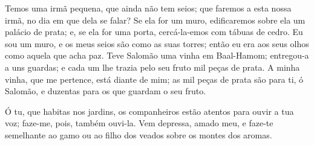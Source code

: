 Temos uma irmã pequena, que ainda não tem seios; que faremos a
esta nossa irmã, no dia em que dela se falar? Se ela for um
muro, edificaremos sobre ela um palácio de prata; e, se ela for uma
porta, cercá-la-emos com tábuas de cedro. Eu sou um muro, e
os meus seios são como as suas torres; então eu era aos seus olhos
como aquela que acha paz. Teve Salomão uma vinha em
Baal-Hamom; entregou-a a uns guardas; e cada um lhe trazia pelo seu
fruto mil peças de prata. A minha vinha, que me pertence,
está diante de mim; as mil peças de prata são para ti, ó Salomão, e
duzentas para os que guardam o seu fruto.

Ó tu, que habitas nos jardins, os companheiros estão atentos para
ouvir a tua voz; faze-me, pois, também ouvi-la. Vem depressa,
amado meu, e faze-te semelhante ao gamo ou ao filho dos veados sobre
os montes dos aromas.

